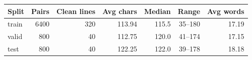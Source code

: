 \begin{tabular}{lrrrrrr}
\toprule
Split & Pairs & Clean lines & Avg chars & Median & Range & Avg words \\
\midrule
train & 6400 & 320 & 113.94 & 115.5 & 35--180 & 17.19 \\
valid & 800 & 40 & 112.75 & 120.0 & 41--174 & 17.15 \\
test & 800 & 40 & 122.25 & 122.0 & 39--178 & 18.18 \\
\bottomrule
\end{tabular}

